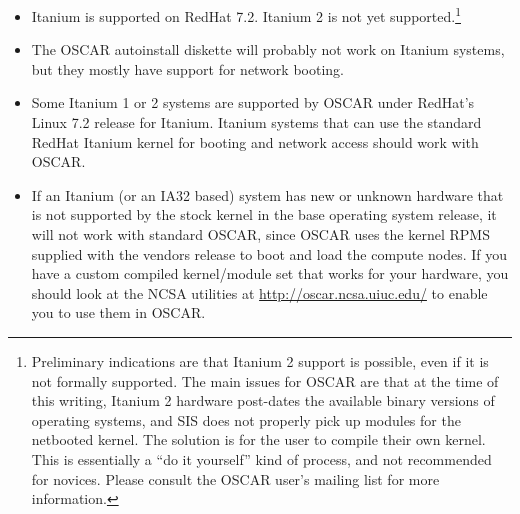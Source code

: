 \begin{itemize}
  
\item Itanium is supported on RedHat 7.2.  Itanium 2 is not yet
  supported.\footnote{Preliminary indications are that Itanium 2
    support is possible, even if it is not formally supported.  The
    main issues for OSCAR are that at the time of this writing,
    Itanium 2 hardware post-dates the available binary versions of
    operating systems, and SIS does not properly pick up modules for
    the netbooted kernel.  The solution is for the user to compile
    their own kernel.  This is essentially a ``do it yourself'' kind
    of process, and not recommended for novices.  Please consult the
    OSCAR user's mailing list for more information.}

\item The OSCAR autoinstall diskette will probably not work on Itanium
  systems, but they mostly have support for network booting.
  
\item Some Itanium 1 or 2 systems are supported by OSCAR under
  RedHat's Linux 7.2 release for Itanium.  Itanium systems that can
  use the standard RedHat Itanium kernel for booting and network
  access should work with OSCAR.
  
\item If an Itanium (or an IA32 based) system has new or unknown
  hardware that is not supported by the stock kernel in the base
  operating system release, it will not work with standard OSCAR,
  since OSCAR uses the kernel RPMS supplied with the vendors release
  to boot and load the compute nodes.  If you have a custom compiled
  kernel/module set that works for your hardware, you should look at
  the NCSA utilities at \url{http://oscar.ncsa.uiuc.edu/} to
  enable you to use them in OSCAR.
\end{itemize}

